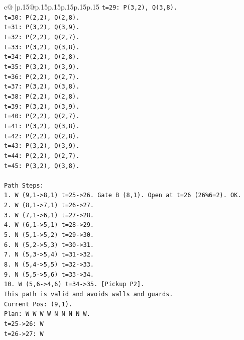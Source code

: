 \documentclass{article}
\begin{document}
{\begin{supertabular}{c@{$\;$}|p{.15\linewidth}@{}p{.15\linewidth}p{.15\linewidth}p{.15\linewidth}p{.15\linewidth}p{.15\linewidth}}
{{{\texttt{t=29: P(3,2), Q(3,8).} \\
\texttt{t=30: P(2,2), Q(2,8).} \\
\texttt{t=31: P(3,2), Q(3,9).} \\
\texttt{t=32: P(2,2), Q(2,7).} \\
\texttt{t=33: P(3,2), Q(3,8).} \\
\texttt{t=34: P(2,2), Q(2,8).} \\
\texttt{t=35: P(3,2), Q(3,9).} \\
\texttt{t=36: P(2,2), Q(2,7).} \\
\texttt{t=37: P(3,2), Q(3,8).} \\
\texttt{t=38: P(2,2), Q(2,8).} \\
\texttt{t=39: P(3,2), Q(3,9).} \\
\texttt{t=40: P(2,2), Q(2,7).} \\
\texttt{t=41: P(3,2), Q(3,8).} \\
\texttt{t=42: P(2,2), Q(2,8).} \\
\texttt{t=43: P(3,2), Q(3,9).} \\
\texttt{t=44: P(2,2), Q(2,7).} \\
\texttt{t=45: P(3,2), Q(3,8).} \\
\\ 
\texttt{Path Steps:} \\
\texttt{1. W (9,1{-}>8,1) t=25{-}>26. Gate B (8,1). Open at t=26 (26\%6=2). OK.} \\
\texttt{2. W (8,1{-}>7,1) t=26{-}>27.} \\
\texttt{3. W (7,1{-}>6,1) t=27{-}>28.} \\
\texttt{4. W (6,1{-}>5,1) t=28{-}>29.} \\
\texttt{5. N (5,1{-}>5,2) t=29{-}>30.} \\
\texttt{6. N (5,2{-}>5,3) t=30{-}>31.} \\
\texttt{7. N (5,3{-}>5,4) t=31{-}>32.} \\
\texttt{8. N (5,4{-}>5,5) t=32{-}>33.} \\
\texttt{9. N (5,5{-}>5,6) t=33{-}>34.} \\
\texttt{10. W (5,6{-}>4,6) t=34{-}>35. {[}Pickup P2{]}.} \\
\texttt{This path is valid and avoids walls and guards.} \\
\texttt{Current Pos: (9,1).} \\
\texttt{Plan: W W W W N N N N W.} \\
\texttt{t=25{-}>26: W} \\
\texttt{t=26{-}>27: W} \\
}}}
\end{supertabular}}
\end{document}

